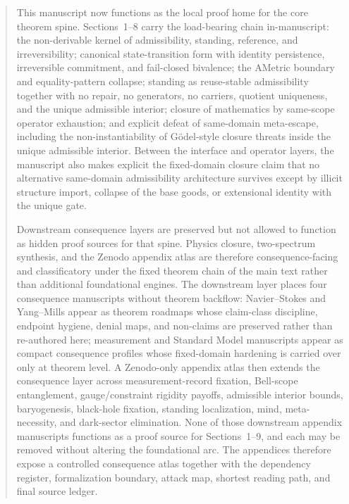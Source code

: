 \begin{abstract}
This manuscript now functions as the local proof home for the core theorem spine. Sections~1--8 carry the load-bearing chain in-manuscript: the non-derivable kernel of admissibility, standing, reference, and irreversibility; canonical state-transition form with identity persistence, irreversible commitment, and fail-closed bivalence; the AMetric boundary and equality-pattern collapse; standing as reuse-stable admissibility together with no repair, no generators, no carriers, quotient uniqueness, and the unique admissible interior; closure of mathematics by same-scope operator exhaustion; and explicit defeat of same-domain meta-escape, including the non-instantiability of G\"odel-style closure threats inside the unique admissible interior. Between the interface and operator layers, the manuscript also makes explicit the fixed-domain closure claim that no alternative same-domain admissibility architecture survives except by illicit structure import, collapse of the base goods, or extensional identity with the unique gate.

Downstream consequence layers are preserved but not allowed to function as hidden proof sources for that spine. Physics closure, two-spectrum synthesis, and the Zenodo appendix atlas are therefore consequence-facing and classificatory under the fixed theorem chain of the main text rather than additional foundational engines. The downstream layer places four consequence manuscripts without theorem backflow: Navier--Stokes and Yang--Mills appear as theorem roadmaps whose claim-class discipline, endpoint hygiene, denial maps, and non-claims are preserved rather than re-authored here; measurement and Standard Model manuscripts appear as compact consequence profiles whose fixed-domain hardening is carried over only at theorem level. A Zenodo-only appendix atlas then extends the consequence layer across measurement-record fixation, Bell-scope entanglement, gauge/constraint rigidity payoffs, admissible interior bounds, baryogenesis, black-hole fixation, standing localization, mind, meta-necessity, and dark-sector elimination. None of those downstream appendix manuscripts functions as a proof source for Sections~1--9, and each may be removed without altering the foundational arc. The appendices therefore expose a controlled consequence atlas together with the dependency register, formalization boundary, attack map, shortest reading path, and final source ledger.
\end{abstract}
